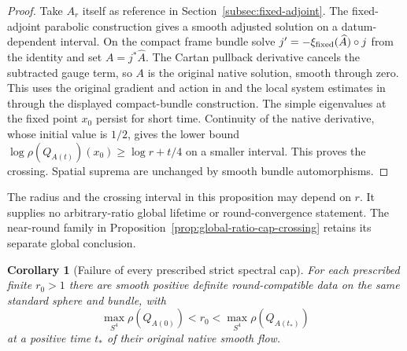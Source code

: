 \documentclass[11pt]{article}
\numberwithin{equation}{section}
\newtheorem{corollary}[theorem]{Corollary}
\theoremstyle{definition}
\theoremstyle{remark}
\begin{document}
\begin{proof}
Take $A_r$ itself as reference in
Section~\ref{subsec:fixed-adjoint}. The fixed-adjoint
parabolic construction gives a smooth adjusted solution
on a datum-dependent interval. On the compact frame
bundle solve $j'=-\xi_{\rm fixed}(\widehat A)\circ j$
from the identity and set $A=j^*\widehat A$. The Cartan
pullback derivative cancels the subtracted gauge term,
so $A$ is the original native solution, smooth through
zero. This uses the original gradient and action in
\cite[Proposition 4.2 and Section 4.2]{Fine2011} and the
local system estimates in
\cite[Chapter 7, Propositions 7.3.A--B]{Taylor1991Nonlinear}
through the displayed compact-bundle construction.
The simple eigenvalues at the fixed point $x_0$ persist
for short time. Continuity of the native derivative,
whose initial value is $1/2$, gives the lower bound
$\log\rho(Q_{A(t)})(x_0)\ge\log r+t/4$ on a smaller
interval. This proves the crossing. Spatial suprema are
unchanged by smooth bundle automorphisms.
\end{proof}

The radius and the crossing interval in this proposition
may depend on $r$. It supplies no arbitrary-ratio global
lifetime or round-convergence statement. The near-round
family in Proposition~\ref{prop:global-ratio-cap-crossing}
retains its separate global conclusion.

\begin{corollary}[Failure of every prescribed strict spectral cap]
\label{cor:strict-ratio-cap-crossing}
For each prescribed finite $r_0>1$ there are smooth positive
definite round-compatible data on the same standard sphere
and bundle, with
\[
 \max_{S^4}\rho(Q_{A(0)})<r_0
       <\max_{S^4}\rho(Q_{A(t_*)})
\]
at a positive time $t_*$ of their original native smooth flow.
\end{corollary}
\end{document}
